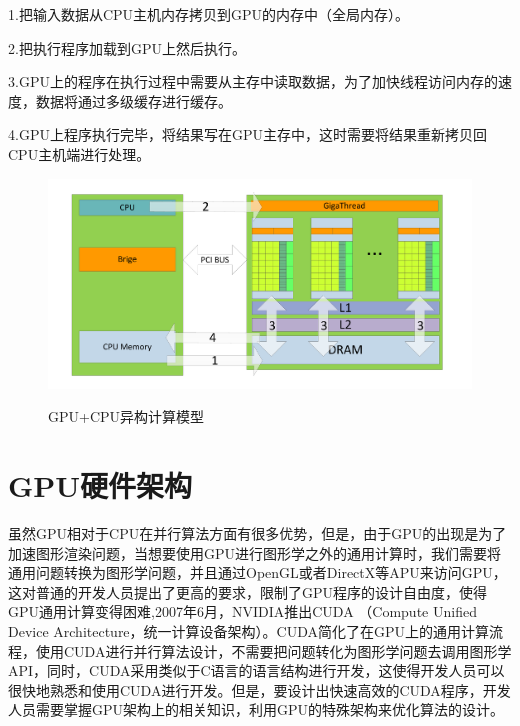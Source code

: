 1.把输入数据从CPU主机内存拷贝到GPU的内存中（全局内存）。

2.把执行程序加载到GPU上然后执行。

3.GPU上的程序在执行过程中需要从主存中读取数据，为了加快线程访问内存的速度，数据将通过多级缓存进行缓存。

4.GPU上程序执行完毕，将结果写在GPU主存中，这时需要将结果重新拷贝回CPU主机端进行处理。
\begin{figure}
\setlength{\belowcaptionskip}{-0.5cm}
\begin{center}
{\includegraphics[width=1 \textwidth]{figures/yigou.pdf}}
\end{center}
\caption{{\footnotesize{GPU+CPU异构计算模型}}}
\label{GCY}
\end{figure}
\section{GPU硬件架构}

虽然GPU相对于CPU在并行算法方面有很多优势，但是，由于GPU的出现是为了加速图形渲染问题，当想要使用GPU进行图形学之外的通用计算时，我们需要将通用问题转换为图形学问题，并且通过OpenGL或者DirectX等APU来访问GPU，这对普通的开发人员提出了更高的要求，限制了GPU程序的设计自由度，使得GPU通用计算变得困难,2007年6月，NVIDIA推出CUDA （Compute Unified Device Architecture，统一计算设备架构）。CUDA简化了在GPU上的通用计算流程，使用CUDA进行并行算法设计，不需要把问题转化为图形学问题去调用图形学API，同时，CUDA采用类似于C语言的语言结构进行开发，这使得开发人员可以很快地熟悉和使用CUDA进行开发。但是，要设计出快速高效的CUDA程序，开发人员需要掌握GPU架构上的相关知识，利用GPU的特殊架构来优化算法的设计。

